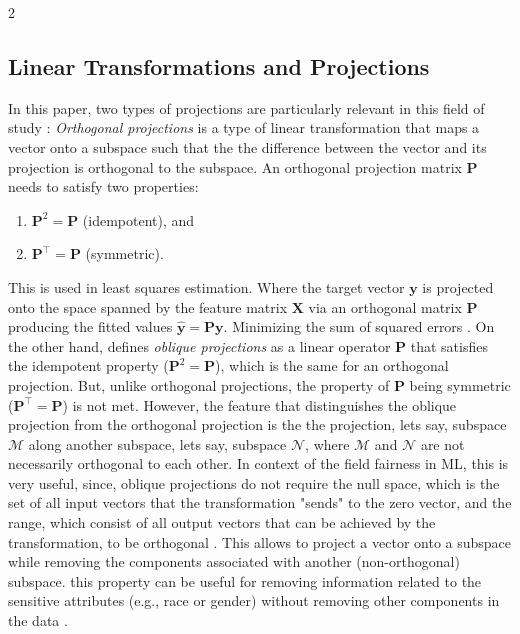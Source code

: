 \documentclass[ecta,nameyear,final]{econsocart}
\numberwithin{equation}{section}
\theoremstyle{plain}
\theoremstyle{definition}
\begin{document}
\begin{multicols}{2}
\subsection{Linear Transformations and Projections}
In this paper, two types of projections are particularly relevant in this field of study \citep{Behrens1994}:
\newline \newline
\emph{Orthogonal projections} is a type of linear transformation that maps a vector onto a subspace such that the the difference between the vector and its projection is orthogonal to the subspace. An orthogonal projection matrix $\mathbf{P}$ needs to satisfy two properties:
\begin{enumerate}
    \item $\mathbf{P}^2 = \mathbf{P}$ (idempotent), and
    \item $\mathbf{P}^{\top} = \mathbf{P}$ (symmetric).
\end{enumerate}
This is used in least squares estimation. Where the target vector $\mathbf{y}$ is projected onto the space spanned by the feature matrix $\mathbf{X}$ via an orthogonal matrix $\mathbf{P}$ producing the fitted values $\hat{\mathbf{y}} = \mathbf{P}\mathbf{y}$. Minimizing the sum of squared errors \citep{heij2004econometric}.
\newline \newline
On the other hand, \cite{kayalar1989oblique} defines \emph{oblique projections} as a linear operator $\mathbf{P}$ that satisfies the idempotent property ($\mathbf{P}^2=\mathbf{P}$), which is the same for an orthogonal projection. But, unlike orthogonal projections, the property of $\mathbf{P}$ being symmetric ($\mathbf{P}^{\top} = \mathbf{P}$) is not met. However, the feature that distinguishes the oblique projection from the orthogonal projection is the the projection, lets say, subspace $\mathcal{M}$ along another subspace, lets say, subspace $\mathcal{N}$, where $\mathcal{M}$ and $\mathcal{N}$ are not necessarily orthogonal to each other.
\newline \newline
In context of the field fairness in ML, this is very useful, since, oblique projections do not require the null space, which is the set of all input vectors that the transformation "sends" to the zero vector, and the range, which consist of all output vectors that can be achieved by the transformation, to be orthogonal \citep{bretscher1997linear}. This allows to project a vector onto a subspace while removing the components associated with another (non-orthogonal) subspace. this property can be useful for removing information related to the sensitive attributes (e.g., race or gender) without removing other components in the data \citep{Behrens1994}. 

\end{multicols}
\end{document}
